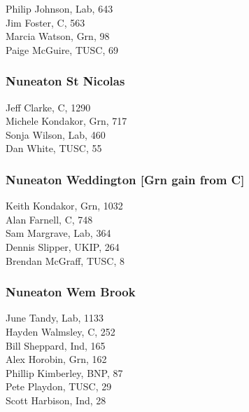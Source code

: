 \documentclass[a4paper,openany,10pt]{book}
\begin{document}


Philip Johnson, Lab, 643\\
Jim Foster, C, 563\\
Marcia Watson, Grn, 98\\
Paige McGuire, TUSC, 69\\


\subsubsection*{Nuneaton St Nicolas}



Jeff Clarke, C, 1290\\
Michele Kondakor, Grn, 717\\
Sonja Wilson, Lab, 460\\
Dan White, TUSC, 55\\


\subsubsection*{Nuneaton Weddington \hspace*{\fill}\nolinebreak[1]%
\enspace\hspace*{\fill}
[Grn gain from C]}



Keith Kondakor, Grn, 1032\\
Alan Farnell, C, 748\\
Sam Margrave, Lab, 364\\
Dennis Slipper, UKIP, 264\\
Brendan McGraff, TUSC, 8\\


\subsubsection*{Nuneaton Wem Brook}



June Tandy, Lab, 1133\\
Hayden Walmsley, C, 252\\
Bill Sheppard, Ind, 165\\
Alex Horobin, Grn, 162\\
Phillip Kimberley, BNP, 87\\
Pete Playdon, TUSC, 29\\
Scott Harbison, Ind, 28\\
\end{document}
